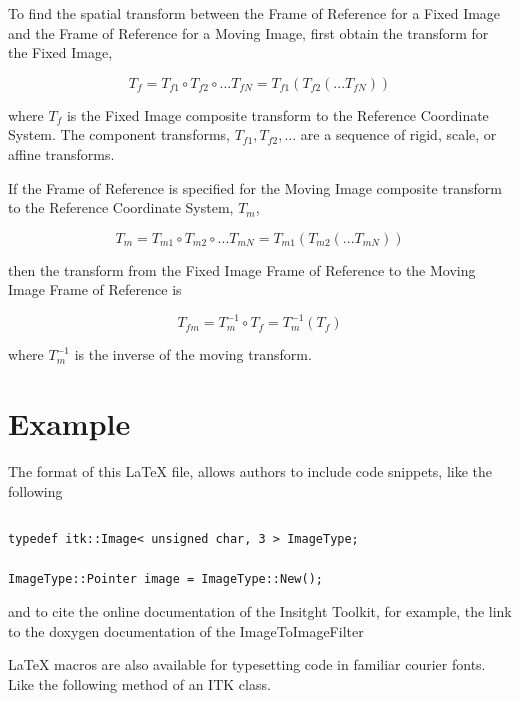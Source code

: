 \documentclass{InsightArticle}
\begin{document}
To find the spatial transform between the Frame of Reference for a Fixed Image
and the Frame of Reference for a Moving Image, first obtain the transform for
the Fixed Image,

\begin{equation}
  T_f = T_{f1} \circ T_{f2} \circ ... T_{fN} = T_{f1}( T_{f2}( ... T_{fN} ))
\end{equation}

where $T_f$ is the Fixed Image composite transform to the Reference Coordinate
System. The component transforms, $T_{f1}, T_{f2}, ...$ are a sequence of
rigid, scale, or affine transforms.

If the Frame of Reference is specified for the Moving Image composite
transform to the Reference Coordinate System, $T_m$,

\begin{equation}
  T_m = T_{m1} \circ T_{m2} \circ ... T_{mN} = T_{m1}( T_{m2}( ... T_{mN} ))
\end{equation}

then the transform from the Fixed Image Frame of Reference to the Moving Image
Frame of Reference is

\begin{equation}
  T_{fm} = T_m^{-1} \circ T_f = T_m^{-1}( T_f )
\end{equation}

where $T_m^{-1}$ is the inverse of the moving transform.

\section{Example}

The format of this LaTeX file, allows authors to include code snippets, like
the following

\inputminted[baselinestretch=1,fontsize=\footnotesize,linenos=false]{c++}{Module/test/ReadDicomTransformAndResampleExample.cxx}

\small
\begin{verbatim}
typedef itk::Image< unsigned char, 3 > ImageType;

ImageType::Pointer image = ImageType::New();
\end{verbatim}
\normalsize

and to cite the online documentation of the Insitght Toolkit, for example, the
link to the doxygen documentation of the ImageToImageFilter


LaTeX macros are also available for typesetting code in familiar courier fonts.
Like the following method of an ITK class.
\end{document}
